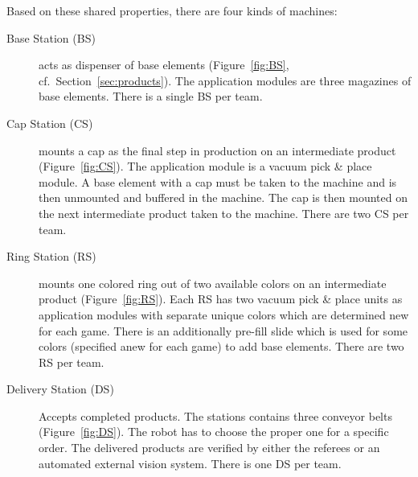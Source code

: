 \documentclass[12pt,twoside]{article}
\newcommand{\refsec}[1]{Section~\ref{#1}}
\newcommand{\reffig}[1]{Figure~\ref{#1}}
\begin{document}
Based on these shared properties, there are four kinds of machines:

\begin{description}
\item[Base Station (BS)] acts as dispenser of base elements
  (\reffig{fig:BS}, cf.~\refsec{sec:products}). The application
  modules are three magazines of base elements. There is a single BS
  per team.

\item[Cap Station (CS)] mounts a cap as the final step in production
  on an intermediate product (\reffig{fig:CS}). The application module
  is a vacuum pick \& place module. A base element with a cap must be
  taken to the machine and is then unmounted and buffered in the
  machine. The cap is then mounted on the next intermediate product
  taken to the machine. There are two CS per team.

\item[Ring Station (RS)] mounts one colored ring out of two available
  colors on an intermediate product (\reffig{fig:RS}). Each RS has two
  vacuum pick \& place units as application modules with separate
  unique colors which are determined new for each game. There is an
  additionally pre-fill slide which is used for some colors (specified
  anew for each game) to add base elements. There are two RS per team.

\item[Delivery Station (DS)] Accepts completed products. The stations
  contains three conveyor belts (\reffig{fig:DS}). The robot has to
  choose the proper one for a specific order. The delivered products
  are verified by either the referees or an automated external vision
  system. There is one DS per team.
\end{description}
\end{document}
